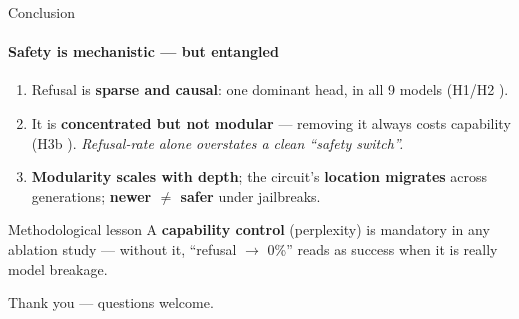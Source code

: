 \documentclass[aspectratio=169]{beamer}
\newcommand{\good}{\textcolor{themeblue!80!black}{\ding{51}}}
\newcommand{\bad}{\textcolor{red!70!black}{\ding{55}}}
\newcommand{\hl}[1]{\textcolor{themeblue}{\textbf{#1}}}
\begin{document}
\begin{frame}{Conclusion}
  \framesubtitle{Safety is mechanistic --- but entangled}
  \begin{enumerate}
    \item Refusal is \hl{sparse and causal}: one dominant head, in all 9 models (H1/H2 \good).
    \item It is \hl{concentrated but not modular} --- removing it always costs capability (H3b \bad). \emph{Refusal-rate alone overstates a clean ``safety switch''.}
    \item \hl{Modularity scales with depth}; the circuit's \hl{location migrates} across generations; \hl{newer $\ne$ safer} under jailbreaks.
  \end{enumerate}
  \vspace{6pt}
  \begin{block}{Methodological lesson}
    A \hl{capability control} (perplexity) is mandatory in any ablation study --- without it, ``refusal $\rightarrow$ 0\%'' reads as success when it is really model breakage.
  \end{block}
  \vspace{4pt}
  \centering\small Thank you --- questions welcome.
\end{frame}
\end{document}

